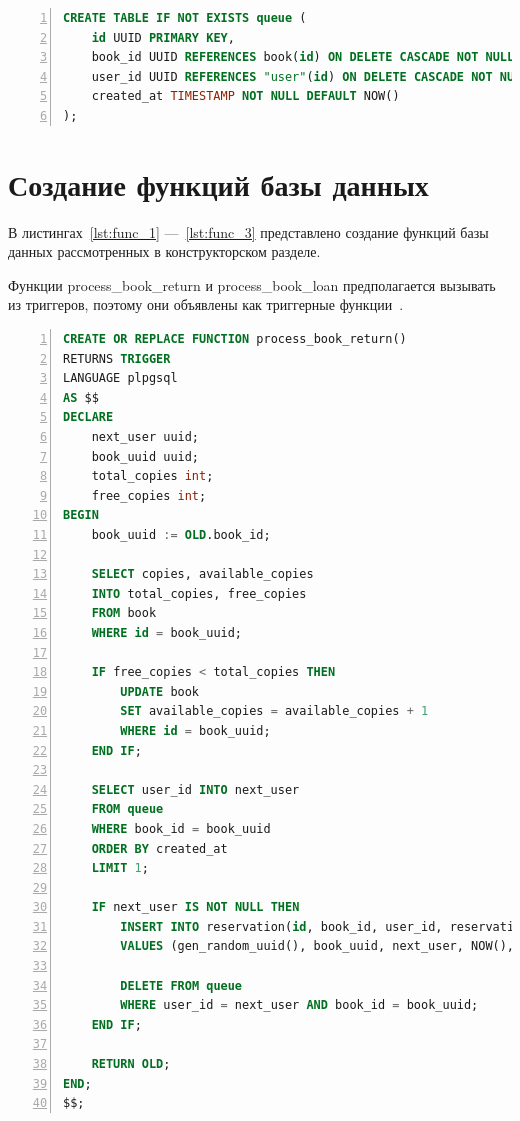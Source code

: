 \begin{center}
	\captionsetup{justification=raggedright,singlelinecheck=off}
	\begin{lstlisting}[language=sql, frame=single, numbers=left, label=lst:queue, caption=Создание таблицы queue]
CREATE TABLE IF NOT EXISTS queue (
	id UUID PRIMARY KEY,
	book_id UUID REFERENCES book(id) ON DELETE CASCADE NOT NULL,
	user_id UUID REFERENCES "user"(id) ON DELETE CASCADE NOT NULL,
	created_at TIMESTAMP NOT NULL DEFAULT NOW()
);
	\end{lstlisting}
\end{center}

\section{Создание функций базы данных}
В листингах~\ref{lst:func_1} ---~\ref{lst:func_3} представлено создание функций базы данных рассмотренных в конструкторском разделе.

Функции process\_book\_return и process\_book\_loan предполагается вызывать из триггеров, поэтому они объявлены как триггерные функции~\cite{триггерная_функция}.

\begin{center}
	\captionsetup{justification=raggedright,singlelinecheck=off}
	\begin{lstlisting}[language=sql, frame=single, numbers=left, label=lst:func_1, caption=Создание функции process\_book\_return]
CREATE OR REPLACE FUNCTION process_book_return()
RETURNS TRIGGER 
LANGUAGE plpgsql
AS $$
DECLARE
	next_user uuid;
	book_uuid uuid;
	total_copies int;
	free_copies int;
BEGIN
	book_uuid := OLD.book_id;
	
	SELECT copies, available_copies
	INTO total_copies, free_copies
	FROM book
	WHERE id = book_uuid;
	
	IF free_copies < total_copies THEN
		UPDATE book
		SET available_copies = available_copies + 1
		WHERE id = book_uuid;
	END IF;
	
	SELECT user_id INTO next_user
	FROM queue
	WHERE book_id = book_uuid
	ORDER BY created_at
	LIMIT 1;
	
	IF next_user IS NOT NULL THEN
		INSERT INTO reservation(id, book_id, user_id, reservation_date, cancel_date)
		VALUES (gen_random_uuid(), book_uuid, next_user, NOW(), NOW() + INTERVAL '3 days');
		
		DELETE FROM queue
		WHERE user_id = next_user AND book_id = book_uuid;
	END IF;
	
	RETURN OLD;
END;
$$;

	\end{lstlisting}
\end{center}

